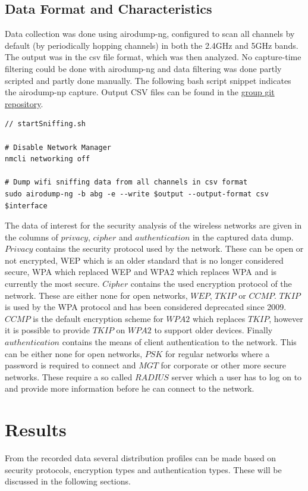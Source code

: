 \documentclass[letterpaper, 10 pt, conference]{ieeeconf}  %
\begin{document}
\subsection{Data Format and Characteristics}
Data collection was done using airodump-ng, configured to scan all channels by default (by periodically hopping channels) in both the 2.4GHz and 5GHz bands. The output was in the csv file format, which was then analyzed. No capture-time filtering could be done with airodump-ng and data filtering was done partly scripted and partly done manually. The following bash script snippet indicates the airodump-np capture. Output CSV files can be found in the \href{https://github.com/HOkkerman/ET4394/tree/master/wireshark_airodump_captures/airodump}{group git repository}.
\begin{lstlisting}
// startSniffing.sh

# Disable Network Manager
nmcli networking off

# Dump wifi sniffing data from all channels in csv format
sudo airodump-ng -b abg -e --write $output --output-format csv $interface

\end{lstlisting}
 
The data of interest for the security analysis of the wireless networks are given in the columns of $privacy$, $cipher$ and $authentication$ in the captured data dump. $Privacy$ contains the security protocol used by the network. These can be open or not encrypted, WEP which is an older standard that is no longer considered secure, WPA which replaced WEP and WPA2 which replaces WPA and is currently the most secure. $Cipher$ contains the used encryption protocol of the network. These are either none for open networks, $WEP$, $TKIP$ or $CCMP$. $TKIP$ is used by the WPA protocol and has been considered deprecated since 2009. $CCMP$ is the default encryption scheme for $WPA2$ which replaces $TKIP$, however it is possible to provide $TKIP$ on $WPA2$ to support older devices. Finally $authentication$ contains the means of client authentication to the network. This can be either none for open networks, $PSK$ for regular networks where a password is required to connect and $MGT$ for corporate or other more secure networks. These require a so called $RADIUS$ server which a user has to log on to and provide more information before he can connect to the network.
 
\section{Results}
From the recorded data several distribution profiles can be made based on security protocols, encryption types and authentication types. These will be discussed in the following sections.
\end{document}
